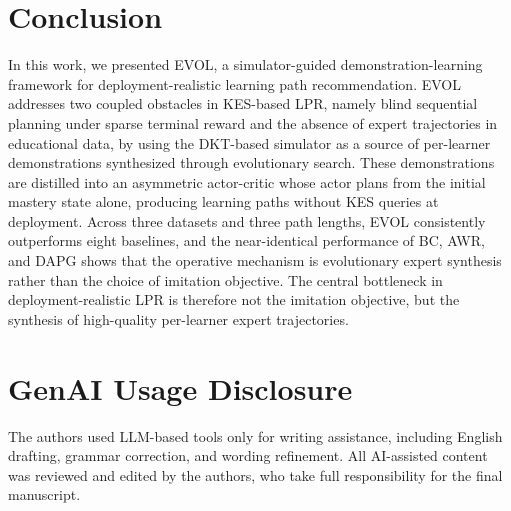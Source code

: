 \documentclass[sigconf,anonymous]{acmart}
\newcommand{\ours}{\textrm{EVOL}}
\begin{document}
\section{Conclusion}

In this work, we presented \ours{}, a simulator-guided demonstration-learning framework for deployment-realistic learning path recommendation. \ours{} addresses two coupled obstacles in KES-based LPR, namely blind sequential planning under sparse terminal reward and the absence of expert trajectories in educational data, by using the DKT-based simulator as a source of per-learner demonstrations synthesized through evolutionary search. These demonstrations are distilled into an asymmetric actor-critic whose actor plans from the initial mastery state alone, producing learning paths without KES queries at deployment. Across three datasets and three path lengths, \ours{} consistently outperforms eight baselines, and the near-identical performance of BC, AWR, and DAPG shows that the operative mechanism is evolutionary expert synthesis rather than the choice of imitation objective. The central bottleneck in deployment-realistic LPR is therefore not the imitation objective, but the synthesis of high-quality per-learner expert trajectories.

\section*{GenAI Usage Disclosure}

The authors used LLM-based tools only for writing assistance, including English drafting, grammar correction, and wording refinement. All AI-assisted content was reviewed and edited by the authors, who take full responsibility for the final manuscript.
\end{document}
